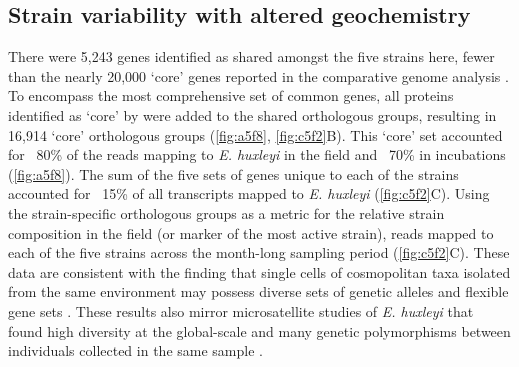 \subsection{Strain variability with altered geochemistry}

There were 5,243 genes identified as shared amongst the five strains here, fewer than the nearly 20,000 `core' genes reported in the comparative genome analysis \citep{Read2013}. To encompass the most comprehensive set of common genes, all proteins identified as `core' by \citet{Read2013} were added to the shared orthologous groups, resulting in 16,914 `core' orthologous groups (\cref{fig:a5f8}, \cref{fig:c5f2}B). This `core' set accounted for ~80\% of the reads mapping to \textit{E. huxleyi} in the field and ~70\% in incubations (\cref{fig:a5f8}). The sum of the five sets of genes unique to each of the strains accounted for ~15\% of all transcripts mapped to \textit{E. huxleyi} (\cref{fig:c5f2}C). Using the strain-specific orthologous groups as a metric for the relative strain composition in the field (or marker of the most active strain), reads mapped to each of the five strains across the month-long sampling period (\cref{fig:c5f2}C).  These data are consistent with the finding that single cells of cosmopolitan taxa isolated from the same environment may possess diverse sets of genetic alleles and flexible gene sets \citep{Kashtan2014}. These results also mirror microsatellite studies of \textit{E. huxleyi} that found high diversity at the global-scale and many genetic polymorphisms between individuals collected in the same sample \citep{Iglesias-Rodriguez2006}. \par

